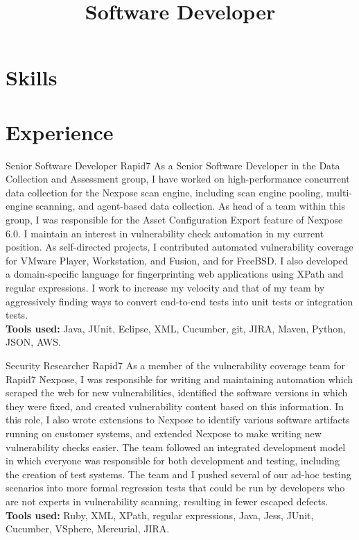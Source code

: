 \documentclass[11pt,letterpaper]{moderncv}
\title{Software Developer}
\begin{document}
\maketitle

\section{Skills}


\section{Experience}

{Senior Software Developer}
{Rapid7}
{}{}
{
As a Senior Software Developer in the Data Collection and Assessment group, I have worked on high-performance concurrent data collection for the Nexpose scan engine, including scan engine pooling, multi-engine scanning, and agent-based data collection. As head of a team within this group, I was responsible for the Asset Configuration Export feature of Nexpose 6.0. I maintain an interest in vulnerability check automation in my current position. As self-directed projects, I contributed automated vulnerability coverage for VMware Player, Workstation, and Fusion, and for FreeBSD. I also developed a domain-specific language for fingerprinting web applications using XPath and regular expressions. I work to increase my velocity and that of my team by aggressively finding ways to convert end-to-end tests into unit tests or integration tests. \\
\textbf{Tools used:} Java, JUnit, Eclipse, XML, Cucumber, git, JIRA, Maven, Python, JSON, AWS.
}

\vspace*{0.2\baselineskip}
{Security Researcher}
{Rapid7}
{}{}
{
As a member of the vulnerability coverage team for Rapid7 Nexpose, I was responsible for writing and maintaining automation which scraped the web for new vulnerabilities, identified the software versions in which they were fixed, and created vulnerability content based on this information.  In this role, I also wrote extensions to Nexpose to identify various software artifacts running on customer systems, and extended Nexpose to make writing new vulnerability checks easier.  The team followed an integrated development model in which everyone was responsible for both development and testing, including the creation of test systems. The team and I pushed several of our ad-hoc testing scenarios into more formal regression tests that could be run by developers who are not experts in vulnerability scanning, resulting in fewer escaped defects. \\
\textbf{Tools used:} Ruby, XML, XPath, regular expressions, Java, Jess, JUnit, Cucumber, VSphere, Mercurial, JIRA.
}
\end{document}
